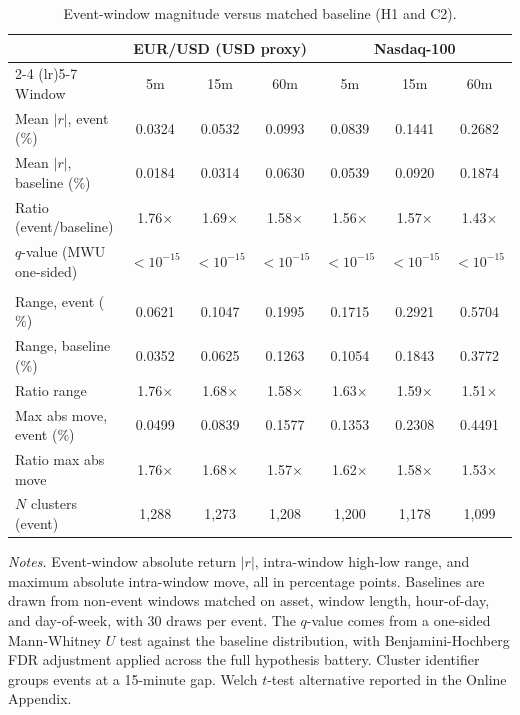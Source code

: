 \begin{table}[!htbp]
\centering
\caption{Event-window magnitude versus matched baseline (H1 and C2).}
\label{tab:h1-main}
\begin{threeparttable}
\small
\begin{tabular}{lcccccc}
\toprule
 & \multicolumn{3}{c}{EUR/USD (USD proxy)} & \multicolumn{3}{c}{Nasdaq-100} \\
\cmidrule(lr){2-4} \cmidrule(lr){5-7}
Window & 5m & 15m & 60m & 5m & 15m & 60m \\
\midrule
Mean $|r|$, event ($\%$) & 0.0324 & 0.0532 & 0.0993 & 0.0839 & 0.1441 & 0.2682 \\
Mean $|r|$, baseline ($\%$) & 0.0184 & 0.0314 & 0.0630 & 0.0539 & 0.0920 & 0.1874 \\
Ratio (event/baseline) & 1.76$\times$ & 1.69$\times$ & 1.58$\times$ & 1.56$\times$ & 1.57$\times$ & 1.43$\times$ \\
$q$-value (MWU one-sided) & ${<}10^{-15}$ & ${<}10^{-15}$ & ${<}10^{-15}$ & ${<}10^{-15}$ & ${<}10^{-15}$ & ${<}10^{-15}$ \\
\addlinespace
\multicolumn{7}{l}{\textit{C2: intra-window range and maximum absolute move}} \\
Range, event ($\%$) & 0.0621 & 0.1047 & 0.1995 & 0.1715 & 0.2921 & 0.5704 \\
Range, baseline ($\%$) & 0.0352 & 0.0625 & 0.1263 & 0.1054 & 0.1843 & 0.3772 \\
Ratio range & 1.76$\times$ & 1.68$\times$ & 1.58$\times$ & 1.63$\times$ & 1.59$\times$ & 1.51$\times$ \\
Max abs move, event ($\%$) & 0.0499 & 0.0839 & 0.1577 & 0.1353 & 0.2308 & 0.4491 \\
Ratio max abs move & 1.76$\times$ & 1.68$\times$ & 1.57$\times$ & 1.62$\times$ & 1.58$\times$ & 1.53$\times$ \\
\addlinespace
$N$ clusters (event) & 1,288 & 1,273 & 1,208 & 1,200 & 1,178 & 1,099 \\
\bottomrule
\end{tabular}
\begin{tablenotes}
\footnotesize
\item \textit{Notes.} Event-window absolute return $|r|$, intra-window
high-low range, and maximum absolute intra-window move, all in percentage
points. Baselines are drawn from non-event windows matched on asset,
window length, hour-of-day, and day-of-week, with 30 draws per event.
The $q$-value comes from a one-sided Mann-Whitney $U$ test against
the baseline distribution, with Benjamini-Hochberg FDR adjustment
applied across the full hypothesis battery. Cluster identifier groups
events at a 15-minute gap. Welch $t$-test alternative reported in
the Online Appendix.
\end{tablenotes}
\end{threeparttable}
\end{table}
